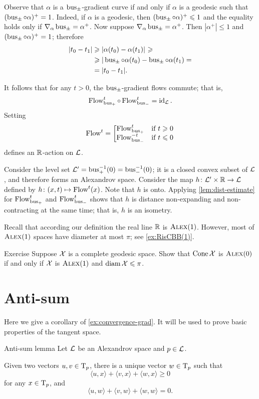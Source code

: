 Observe that $\alpha$ is a $\operatorname{\rm bus}\nolimits_\pm$-gradient curve
if and only if $\alpha$ is a geodesic such that $(\operatorname{\rm bus}\nolimits_\pm\circ\alpha)^+=1$.
Indeed, if $\alpha$ is a geodesic, then $(\operatorname{\rm bus}\nolimits_\pm\circ\alpha)^+\leqslant 1$ and the equality holds only if $\nabla_\alpha\operatorname{\rm bus}\nolimits_\pm=\alpha^+$.
Now suppose $\nabla_\alpha\operatorname{\rm bus}\nolimits_\pm=\alpha^+$.
Then $|\alpha^+|\le 1$ and $(\operatorname{\rm bus}\nolimits_\pm\circ\alpha)^+=1$; therefore 
\begin{align*}
|t_0-t_1|&\ge \dist{\alpha(t_0)}{\alpha(t_1)}{}\ge
\\
&\ge|\bus_\pm\circ\alpha(t_0)-\bus_\pm\circ\alpha(t_1)=
\\
&=|t_0-t_1|.
\end{align*}

It follows that for any $t>0$, the $\operatorname{\rm bus}\nolimits_\pm$-gradient flows commute;
that is, 
\[\mathop{\rm Flow}\nolimits_{\operatorname{\rm bus}\nolimits_+}^t\circ\mathop{\rm Flow}\nolimits_{\operatorname{\rm bus}\nolimits_-}^t=\operatorname{\rm id}\nolimits_{\mathcal{L}}.\]
Setting
\[\mathop{\rm Flow}\nolimits^t=\left[\begin{matrix}
\mathop{\rm Flow}\nolimits_{\operatorname{\rm bus}\nolimits_+}^t&\hbox{if}\ t\geqslant0\\
\mathop{\rm Flow}\nolimits_{\operatorname{\rm bus}\nolimits_-}^{-t}&\hbox{if}\ t\leqslant0
               \end{matrix}\right.\]
defines an $\mathbb{R}$-action on $\mathcal{L}$.

Consider the level set $\mathcal{L}'=\operatorname{\rm bus}\nolimits_+^{-1}(0)=\operatorname{\rm bus}\nolimits_-^{-1}(0)$;
it is a closed convex subset of $\mathcal{L}$, and therefore forms an Alexandrov space.
Consider the map $h\colon\mathcal{L}'\times \mathbb{R}\to \mathcal{L}$ defined by $h\colon(x,t)\mapsto \mathop{\rm Flow}\nolimits^t(x)$.
Note that $h$ is onto.
Applying \ref{lem:dist-estimate} for $\mathop{\rm Flow}\nolimits_{\operatorname{\rm bus}\nolimits_+}^t$ and $\mathop{\rm Flow}\nolimits_{\operatorname{\rm bus}\nolimits_-}^t$ shows that $h$ is distance non-expanding and non-contracting at the same time; that is, $h$ is an isometry.
\qeds

Recall that according our definition the real line $\mathbb{R}$ is $\textsc{Alex}(1)$.
However, most of $\textsc{Alex}(1)$ spaces have diameter at most $\pi$;
see \ref{ex:RisCBB(1)}.

\begin{thm}{Exercise}\label{ex:cone-CBB}
Suppose $\mathcal{X}$ is a complete geodesic space.
Show that $\mathop{\rm Cone}\nolimits\mathcal{X}$ is $\textsc{Alex}(0)$ if and only if $\mathcal{X}$ is $\textsc{Alex}(1)$ and $\operatorname{\rm diam}\nolimits\mathcal{X}\leqslant \pi$.
\end{thm}

\section{Anti-sum}

Here we give a corollary of \ref{ex:convergence-grad}.
It will be used to prove basic properties of the tangent space.


\begin{thm}{Anti-sum lemma}\label{lem:minus-sum} 
Let $\mathcal{L}$ be an Alexandrov space and $p\in \mathcal{L}$.

Given two vectors $u,v\in \mathrm{T}_p$, there is a unique vector $w\in \mathrm{T}_p$ such that
\[\langle u,x\rangle +\langle v,x\rangle +\langle w,x\rangle \ge 0\]
for any $x\in \mathrm{T}_p$, and
\[\langle u,w\rangle +\langle v,w\rangle +\langle w,w\rangle =0.\]

\end{thm}

